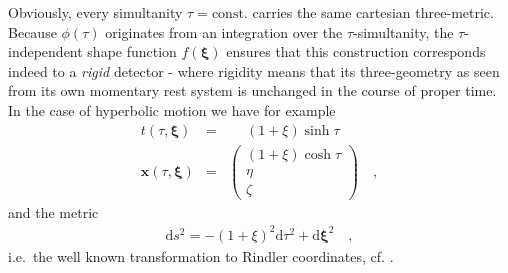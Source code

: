 \documentclass[a4paper,12pt]{article}
\newcommand{\vx}{\mathbf{x}}
\newcommand{\vxi}{\boldsymbol{\xi}}
\renewcommand{\d}{\mathrm{d}}
\begin{document}
Obviously, every simultanity $\tau=\mathrm{const.}$ carries the same cartesian 
three-metric.
Because $\phi(\tau)$ originates from an integration over the $\tau$-simultanity, 
the $\tau$-independent shape function $f(\vxi)$ ensures that this construction 
corresponds indeed to a {\em rigid} detector - where rigidity means that its 
three-geometry as seen from its own momentary rest system is unchanged in the course of 
proper time. In the case of hyperbolic motion we have for example
\begin{eqnarray*}
t(\tau,\vxi)&=&\quad\; (1+\xi)\sinh\tau\nonumber \\
\vx(\tau,\vxi)&=&\left( \begin{array}{c} (1+\xi)\cosh\tau\\
\eta \\ \zeta 
\end{array} \right)\quad,
\end{eqnarray*}
and the metric 
\begin{eqnarray*}
\d s^2=-(1+\xi)^2\d\tau^2+\d\vxi^2\quad,
\end{eqnarray*}
i.e.\ the well known transformation to Rindler coordinates, cf. \cite{rind}.
\end{document}
